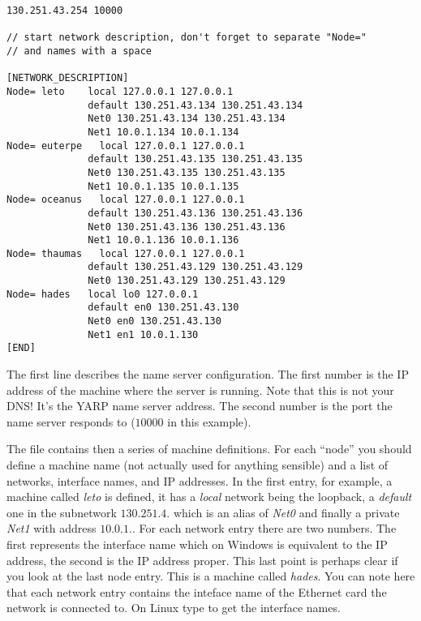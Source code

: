 \begin{verbatim}
130.251.43.254 10000

// start network description, don't forget to separate "Node=" 
// and names with a space

[NETWORK_DESCRIPTION]
Node= leto    local 127.0.0.1 127.0.0.1	
              default 130.251.43.134 130.251.43.134	
              Net0 130.251.43.134 130.251.43.134	
              Net1 10.0.1.134 10.0.1.134
Node= euterpe	local 127.0.0.1 127.0.0.1	
              default 130.251.43.135 130.251.43.135	
              Net0 130.251.43.135 130.251.43.135	
              Net1 10.0.1.135 10.0.1.135
Node= oceanus	local 127.0.0.1 127.0.0.1	
              default 130.251.43.136 130.251.43.136	
              Net0 130.251.43.136 130.251.43.136	
              Net1 10.0.1.136 10.0.1.136
Node= thaumas	local 127.0.0.1 127.0.0.1	
              default 130.251.43.129 130.251.43.129	
              Net0 130.251.43.129 130.251.43.129
Node= hades   local lo0 127.0.0.1		
              default en0 130.251.43.130			
              Net0 en0 130.251.43.130			
              Net1 en1 10.0.1.130
[END]
\end{verbatim}

The first line describes the name server configuration. The first number is the IP address of the machine where the server is running. Note that this is not your DNS! It's the YARP name server address. The second number is the port the name server responds to ($10000$ in this example).

The file contains then a series of machine definitions. For each ``node'' you should define a machine name (not actually used for anything sensible) and a list of networks, interface names, and IP addresses. In the first entry, for example, a machine called {\em leto} is defined, it has a {\em local} network being the loopback, a {\em default} one in the subnetwork $130.251.4.$ which is an alias of {\em Net0} and finally a private {\em Net1} with address $10.0.1.$. For each network entry there are two numbers. The first represents the interface name which on Windows is equivalent to the IP address, the second is the IP address proper.
This last point is perhaps clear if you look at the last node entry. This is a machine called {\em hades}. You can note here that each network entry contains the inteface name of the Ethernet card the network is connected to. On Linux type  to get the interface names.

